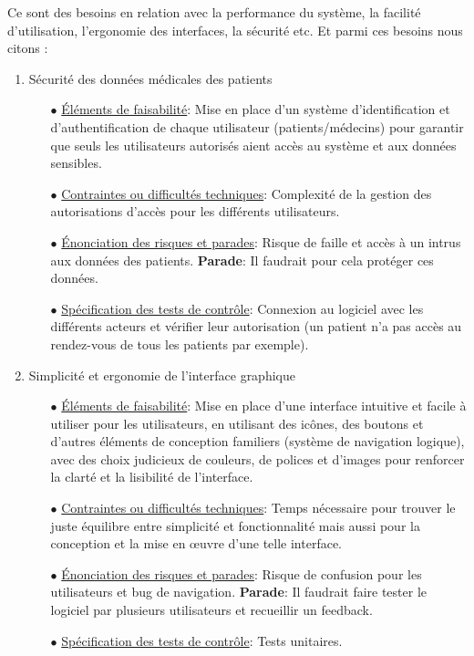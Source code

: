 \documentclass[a4paper]{report}
\begin{document}
Ce sont des besoins en relation avec la performance du système, la facilité d’utilisation,
l’ergonomie des interfaces, la sécurité etc. Et parmi ces besoins nous citons :
\begin{enumerate}
    \item Sécurité des données médicales des patients\newline
    \begin{itemize}
        \item[$\bullet$] \underline{Éléments de faisabilité}: Mise en place d’un système d’identification et d’authentification de chaque utilisateur (patients/médecins) pour garantir que seuls les utilisateurs autorisés aient accès au système et aux données sensibles.
        \item[$\bullet$] \underline{Contraintes ou difficultés techniques}: Complexité de la gestion des autorisations d'accès pour les différents utilisateurs.
        \item[$\bullet$] \underline{Énonciation des risques et parades}: Risque de faille et accès à un intrus aux données des patients.\newline
        \textbf{Parade}: Il faudrait pour cela protéger ces données.
        \item[$\bullet$] \underline{Spécification des tests de contrôle}: Connexion au logiciel avec les différents acteurs et vérifier leur autorisation (un patient n’a pas accès au rendez-vous de tous les patients par exemple). \newline
    \end{itemize}

\item Simplicité et ergonomie de l’interface graphique\newline
\begin{itemize}
    \item[$\bullet$] \underline{Éléments de faisabilité}: Mise en place d’une interface intuitive et facile à utiliser pour les utilisateurs, 
    en utilisant des icônes, des boutons et d'autres éléments de conception familiers (système de navigation logique), avec des choix judicieux de couleurs, 
    de polices et d’images pour renforcer la clarté et la lisibilité de l'interface.
    \item[$\bullet$] \underline{Contraintes ou difficultés techniques}: Temps nécessaire pour trouver le juste équilibre entre simplicité et fonctionnalité 
    mais aussi pour la conception et la mise en œuvre d’une telle interface.
    \item[$\bullet$] \underline{Énonciation des risques et parades}: Risque de confusion pour les utilisateurs et bug de navigation.\newline
    \textbf{Parade}: Il faudrait faire tester le logiciel par plusieurs utilisateurs et recueillir un feedback.
    \item[$\bullet$] \underline{Spécification des tests de contrôle}: Tests unitaires.\newline
\end{itemize}


\end{enumerate}
\end{document}
